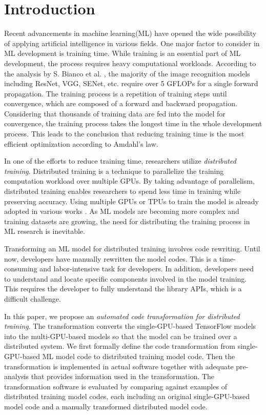 \section{Introduction}\label{sec:intro}

Recent advancements in machine learning(ML) have opened the wide possibility of
applying artificial intelligence in various fields.
One major factor to consider in ML development is training time.
While training is an essential part of ML development,
the process requires heavy computational workloads.
According to the analysis by S. Bianco et al. \cite{bianco2018benchmark},
the majority of the image recognition models including ResNet, VGG, SENet, etc.
require over 5 GFLOPs for a single forward propagation.
The training process is a repetition of training steps until convergence,
which are composed of a forward and backward propagation.
Considering that thousands of training data are fed into the model
for convergence, the training process takes the longest time
in the whole development process. This leads to the conclusion that
reducing training time is the most efficient optimization according to
Amdahl's law.

In one of the efforts to reduce training time, 
researchers utilize \textit{distributed training}.
Distributed training is a technique to parallelize the training computation
workload over multiple GPUs.
By taking advantage of parallelism, distributed training enables researchers
to spend less time in training while preserving accuracy.
Using multiple GPUs or TPUs to train the model is already adopted
in various works \cite{brown2020gpt-3} \cite{silver2017alphazero}
\cite{zhang2019distrspeech} \cite{tian2020distrwebattack}.
As ML models are becoming more complex and training datasets are growing,
the need for distributing the training process in ML research is inevitable.

Transforming an ML model for distributed training involves code rewriting.
Until now, developers have manually rewritten the model codes.
This is a time-consuming and labor-intensive task for developers.
In addition, developers need to understand and locate 
specific components involved in the model training.
This requires the developer to fully understand the library APIs,
which is a difficult challenge.

In this paper, we propose an 
\textit{automated code transformation for distributed training}.
The transformation
converts the single-GPU-based TensorFlow models
into the multi-GPU-based models so that the model can be trained
over a distributed system.
We first formally define the code transformation from
single-GPU-based ML model code to distributed training model code.
Then the transformation is implemented in actual software together with
adequate pre-analysis that provides information used in the transformation.
The transformation software is evaluated by comparing against 
examples of distributed training model codes, 
each including an original single-GPU-based model code 
and a manually transformed distributed model code.

